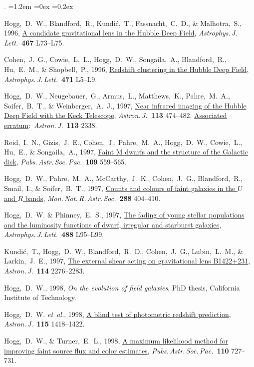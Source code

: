 \documentclass[10pt,letterpaper]{article}
\newcommand{\foreign}[1]{\textsl{#1}}
\newcommand{\etal}{\foreign{et~al.}}
\newcommand{\doi}[2]{\href{http://dx.doi.org/#1}{{#2}}}
\newcommand{\deemph}[1]{\textcolor{grey}{\footnotesize{#1}}}
\newcommand{\pubnumber}[1]{\deemph{{#1}.}}
\newcounter{refpubnum}
\newcommand{\hogglist}{%
    \rightmargin=0in
    \leftmargin=1.2em
    \topsep=0ex
    \partopsep=0pt
    \itemsep=0.2ex
    \parsep=0pt
    \itemindent=-1.0\leftmargin
    \listparindent=0.0\leftmargin
    \settowidth{\labelsep}{~}
    \usecounter{refpubnum}
  }
\begin{document}
\begin{list}{\pubnumber{\therefpubnum}}{\hogglist}
\item
Hogg,~D.~W., Blandford,~R., Kundi\'c,~T., Fassnacht,~C.~D., \& Malhotra,~S., 1996,
\doi{10.1086/310213}{A candidate gravitational lens in the Hubble Deep Field},
\textit{Astrophys.\,J.\,Lett.}\ \textbf{467} L73--L75.
\item
Cohen,~J.~G., Cowie,~L.~L., Hogg,~D.~W., Songaila,~A., Blandford,~R.,
Hu,~E.~M., \& Shopbell,~P., 1996,
\doi{10.1086/310330}{Redshift clustering in the Hubble Deep Field},
\textit{Astrophys.\,J.\,Lett.}\ \textbf{471} L5--L9.
\item
Hogg,~D.~W., Neugebauer,~G., Armus,~L., Matthews,~K., Pahre,~M.~A., Soifer,~B.~T.,
\& Weinberger,~A.~J., 1997,
\doi{10.1086/118269}{Near infrared imaging of the Hubble Deep Field with the Keck Telescope},
\textit{Astron.\,J.}\ \textbf{113} 474--482.
\doi{10.1086/118445}{Associated erratum}:\ \textit{Astron.\,J.}\ \textbf{113} 2338.
\item
Reid,~I.~N., Gizis,~J.~E., Cohen,~J., Pahre,~M.~A., Hogg,~D.~W., Cowie,~L., Hu,~E., \& Songaila,~A., 1997,
\doi{10.1086/133914}{Faint M dwarfs and the structure of the Galactic disk},
\textit{Pubs.\,Astr.\,Soc.\,Pac.}\ \textbf{109} 559--565.
\item
Hogg,~D.~W., Pahre,~M.~A., McCarthy,~J.~K., Cohen,~J.~G., Blandford,~R., Smail,~I., \& Soifer,~B.~T., 1997,
\doi{10.1093/mnras/288.2.404}{Counts and colours of faint galaxies in the $U$ and $R$ bands},
\textit{Mon.\,Not.\,R.\,Astr.\,Soc.}\ \textbf{288} 404--410.
\item
Hogg,~D.~W. \& Phinney,~E.~S., 1997,
\doi{10.1086/310929}{The fading of young stellar populations and the luminosity functions of dwarf, irregular and starburst galaxies},
\textit{Astrophys.\,J.\,Lett.}\ \textbf{488} L95--L99.
\item
Kundi\'c,~T., Hogg,~D.~W., Blandford,~R.~D., Cohen,~J.~G., Lubin,~L.~M., \& Larkin,~J.~E., 1997,
\doi{10.1086/118647}{The external shear acting on gravitational lens B1422+231},
\textit{Astron.\,J.}\ \textbf{114} 2276--2283.
\item
Hogg,~D.~W., 1998,
{\textit{On the evolution of field galaxies},}
PhD thesis, California Institute of Technology.
\item
Hogg,~D.~W. \etal, 1998,
\doi{10.1086/300277}{A blind test of photometric redshift prediction},
\textit{Astron.\,J.}\ \textbf{115} 1418--1422.
\item
Hogg,~D.~W., \& Turner,~E.~L., 1998,
\doi{10.1086/316173}{A maximum likelihood method for improving faint source flux and color estimates},
\textit{Pubs.\,Astr.\,Soc.\,Pac.}\ \textbf{110} 727--731.

\end{list}
\end{document}

